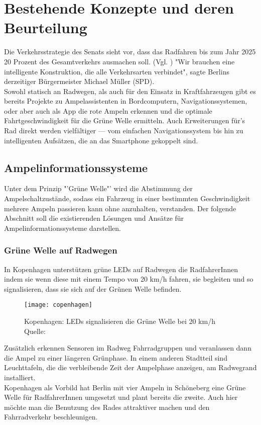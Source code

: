 \chapter{Bestehende Konzepte und deren Beurteilung}
Die Verkehrsstrategie des Senats sieht vor, dass das Radfahren bis zum Jahr 2025 20 Prozent des Gesamtverkehrs ausmachen soll. (Vgl. \cite{Mopo})
"Wir brauchen eine intelligente Konstruktion, die alle Verkehrsarten verbindet", sagte Berlins derzeitiger Bürgermeister Michael Müller (SPD).\\
Sowohl statisch an Radwegen, als auch für den Einsatz in Kraftfahrzeugen gibt es bereits Projekte zu Ampelassistenten in Bordcomputern, Navigationssystemen, oder aber auch als \gls{App} die rote Ampeln erkennen und die optimale Fahrtgeschwindigkeit für die Grüne Welle ermitteln. Auch Erweiterungen für's Rad direkt werden vielfältiger --- vom einfachen Navigationssystem bis hin zu intelligenten Aufsätzen, die an das Smartphone gekoppelt sind.
\section{Ampelinformationssysteme}
Unter dem Prinzip "'Grüne Welle"' wird die Abstimmung der Ampelschaltzustände, sodass ein Fahrzeug in einer bestimmten Geschwindigkeit mehrere Ampeln passieren kann ohne anzuhalten, verstanden. Der folgende Abschnitt soll die existierenden Lösungen und Ansätze für Ampelinformationssysteme darstellen.
\subsection{Grüne Welle auf Radwegen}
In Kopenhagen unterstützen grüne \glspl{LED} auf Radwegen die RadfahrerInnen indem sie wenn diese mit einem Tempo von 20 km/h fahren, sie begleiten und so signalisieren, dass sie sich auf der Grünen Welle befinden. 
\begin{figure}[H]  
    \centering  
    \texttt{[image: copenhagen]} \label{fig:copenhagen}
    \caption[Grüne Welle durch \glspl{LED}]{Kopenhagen: \glspl{LED} signalisieren die Grüne Welle bei 20 km/h  Quelle: \cite{NYT}}
\end{figure}
Zusätzlich erkennen Sensoren im Radweg Fahrradgruppen und veranlassen dann die Ampel zu einer längeren Grünphase. In einem anderen Stadtteil sind Leuchttafeln, die die verbleibende Zeit der Ampelphase anzeigen, am Radwegrand installiert\cite{KopIng}.\\
Kopenhagen als Vorbild hat Berlin mit vier Ampeln in Schöneberg eine Grüne Welle für RadfahrerInnen umgesetzt und plant bereits die zweite\cite{BZ}. Auch hier möchte man die Benutzung des Rades attraktiver machen und den Fahrradverkehr beschleunigen.
